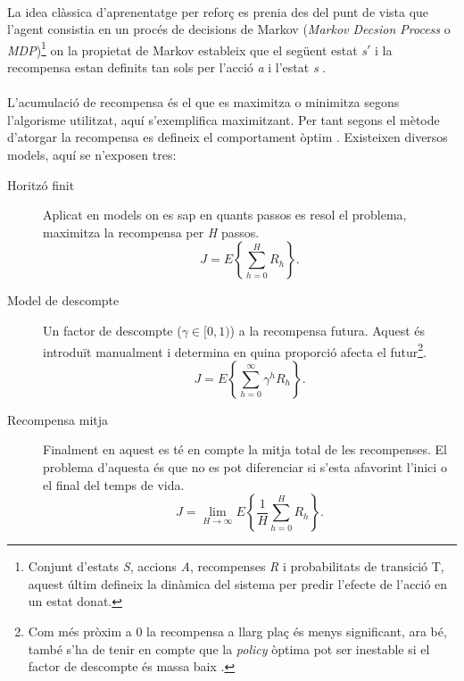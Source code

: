 \documentclass[12pt,a4paper,final,twoside]{article}
\begin{document}
\paragraph{}La idea clàssica d'aprenentatge per reforç es prenia des del punt de vista que l'agent consistia en un procés de decisions de Markov (\textit{Markov Decsion Process} o \textit{MDP})\footnote{Conjunt d'estats \textit{S}, accions \textit{A}, recompenses \textit{R} i probabilitats de transició T, aquest últim defineix la dinàmica del sistema per predir l'efecte de l'acció en un estat donat.} on la propietat de Markov estableix que el següent estat \textit{s}$'$ i la recompensa estan definits tan sols per l'acció \textit{a} i l'estat \textit{s} \cite{Sutton1998}. %


\paragraph{}L'acumulació de recompensa és el que es maximitza o minimitza segons l'algorisme utilitzat, aquí s'exemplifica maximitzant. Per tant segons el mètode d'atorgar la recompensa es defineix el comportament òptim \cite{Kober2009}. Existeixen diversos models, aquí se n'exposen tres:
\begin{description}


\item[Horitzó finit] Aplicat en models on es sap en quants passos es resol el problema, maximitza la recompensa per \textit{H} passos.
\begin{equation}
J=E\left\{ \sum_{h=0}^{H} R_{h} \right\}.
\end{equation}

\item[Model de descompte] Un factor de descompte ($\gamma\in[0,1)$) a la recompensa futura. Aquest és introduït manualment i determina en quina proporció afecta el futur\footnote{Com més pròxim a 0 la recompensa a llarg plaç és menys significant, ara bé, també s'ha de tenir en compte que la \textit{policy} òptima pot ser inestable si el factor de descompte és massa baix \cite{Kober2009}.}.
\begin{equation}
J=E\left\{ \sum_{h=0}^{\infty} \gamma^h R_{h} \right\}.
\end{equation}

\item[Recompensa mitja] Finalment en aquest es té en compte la mitja total de les recompenses. El problema d'aquesta és que no es pot diferenciar si s'esta afavorint l'inici o el final del temps de vida.
\begin{equation}
J=\lim_{H \to \infty} E\left\{ \frac{1}{H}\sum_{h=0}^{H} R_{h} \right\}.
\end{equation} 

\end{description}
\end{document}
